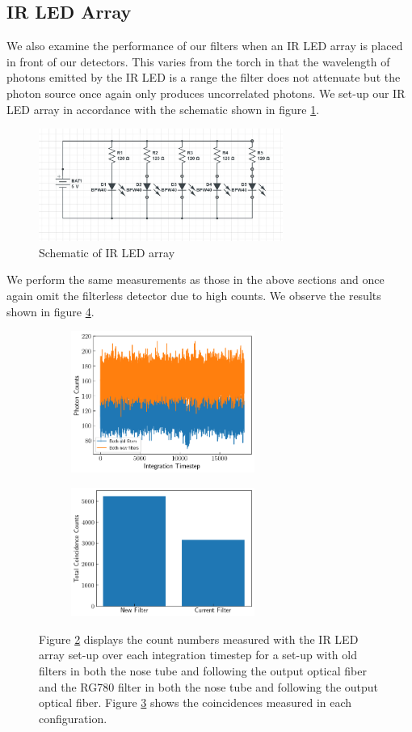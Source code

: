\documentclass[letterpaper, 11 pt]{article}
\begin{document}
\subsection{IR LED Array}
We also examine the performance of our filters when an IR LED array is placed in front of
our detectors. This varies from the torch in that the wavelength of photons emitted by
the IR LED is a range the filter does not attenuate but the photon source once again only produces
uncorrelated photons. We set-up our IR LED array in accordance with the schematic shown in figure \ref{fig:led_scheme}.
\begin{figure}[H]
    \centering
    \includegraphics[width = 8cm]{IR_LED.jpg}
    \caption{Schematic of IR LED array}
    \label{fig:led_scheme}
\end{figure}
We perform the same measurements as those in the above sections and once again omit
the filterless detector due to high counts. We observe the results shown in figure \ref{fig:ir_comp}.
\begin{figure}[H]%
    \centering
    \begin{subfigure}{.4\textwidth}
    \includegraphics[width=6cm]{filter_ch1_IRled.png}
    \caption{ }
    \label{fig:irch1}
    \end{subfigure}
    \begin{subfigure}{.4\textwidth}
    \includegraphics[width = 6cm]{filter_cc_irled.png}
    \caption{ }
    \label{fig:ircc}
    \end{subfigure}
    \caption{Figure \ref{fig:irch1} displays the count numbers measured with the IR LED array set-up over each
    integration timestep for a set-up with old filters in both the
    nose tube and following the output optical fiber and the RG780 filter in
    both the nose tube and following the output optical fiber. Figure
    \ref{fig:ircc} shows the coincidences measured in each configuration.}
    \label{fig:ir_comp}
\end{figure}
\end{document}
